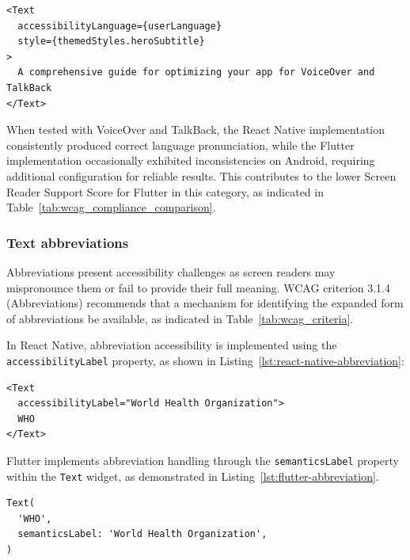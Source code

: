 \begin{lstlisting}[style=ReactNativeStyle, caption=Language handling in AccessibleHub, label=lst:accessiblehub-language]
<Text 
  accessibilityLanguage={userLanguage} 
  style={themedStyles.heroSubtitle}
>
  A comprehensive guide for optimizing your app for VoiceOver and TalkBack
</Text>
\end{lstlisting}

\pagebreak

When tested with VoiceOver and TalkBack, the React Native implementation consistently produced correct language pronunciation, while the Flutter implementation occasionally exhibited inconsistencies on Android, requiring additional configuration for reliable results. This contributes to the lower Screen Reader Support Score for Flutter in this category, as indicated in Table~\ref{tab:wcag_compliance_comparison}.

\subsubsection{Text abbreviations}
\label{subsubsec:text-abbreviations}

Abbreviations present accessibility challenges as screen readers may mispronounce them or fail to provide their full meaning. WCAG criterion 3.1.4 (Abbreviations) recommends that a mechanism for identifying the expanded form of abbreviations be available, as indicated in Table~\ref{tab:wcag_criteria}.

In React Native, abbreviation accessibility is implemented using the \texttt{accessibilityLabel} property, as shown in Listing~\ref{lst:react-native-abbreviation}:

\begin{lstlisting}[style=ReactNativeStyle, caption=Abbreviation handling in React Native, label=lst:react-native-abbreviation]
<Text
  accessibilityLabel="World Health Organization">
  WHO
</Text>
\end{lstlisting}

Flutter implements abbreviation handling through the \texttt{semanticsLabel} property within the \texttt{Text} widget, as demonstrated in Listing~\ref{lst:flutter-abbreviation}.

\begin{lstlisting}[style=DartStyle, caption=Abbreviation handling in Flutter, label=lst:flutter-abbreviation]
Text(
  'WHO',
  semanticsLabel: 'World Health Organization',
)
\end{lstlisting}

